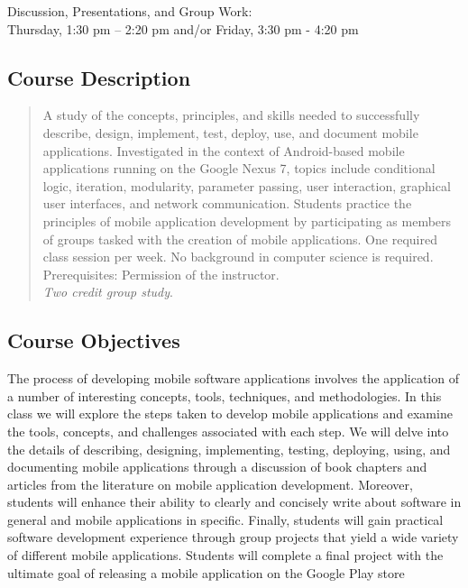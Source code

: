 Discussion, Presentations, and Group Work: \\ Thursday, 1:30 pm -- 2:20 pm and/or Friday, 3:30 pm - 4:20 pm 

\subsection*{Course Description}

\begin{quote}

	A study of the concepts, principles, and skills needed to successfully describe, design, implement, test, deploy,
	use, and document mobile applications.  Investigated in the context of Android-based mobile applications running on
	the Google Nexus 7, topics include conditional logic, iteration, modularity, parameter passing, user interaction,
	graphical user interfaces, and network communication. Students practice the principles of mobile application
	development by participating as members of groups tasked with the creation of mobile applications.  One required
	class session per week. No background in computer science is required. Prerequisites: Permission of the instructor.
	\\ {\em Two credit group study}.
	
\end{quote}

\subsection*{Course Objectives}

The process of developing mobile software applications involves the application of a number of interesting concepts,
tools, techniques, and methodologies.  In this class we will explore the steps taken to develop mobile
applications and examine the tools, concepts, and challenges associated with each step.  We will delve into the details
of describing, designing, implementing, testing, deploying, using, and documenting mobile applications through a
discussion of book chapters and articles from the literature on mobile application development.  Moreover, students will
enhance their ability to clearly and concisely write about software in general and mobile applications in specific.
Finally, students will gain practical software development experience through group projects that yield a wide variety
of different mobile applications. Students will complete a final project with the ultimate goal of releasing a mobile
application on the Google Play store

